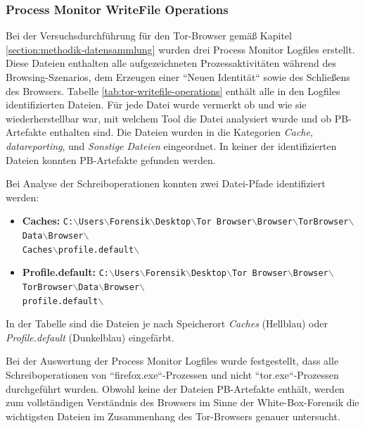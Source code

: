 \begin{appendices}
\subsubsection*{Process Monitor WriteFile Operations}
\label{subsubsection:appendix-tor-common-locations-writefile-operations}
Bei der Versuchsdurchführung für den Tor-Browser gemäß Kapitel \ref{section:methodik-datensammlung} wurden drei Process Monitor Logfiles erstellt.
Diese Dateien enthalten alle aufgezeichneten Prozessaktivitäten während des Browsing-Szenarios, dem Erzeugen einer ``Neuen Identität`` sowie des Schließens des Browsers.
Tabelle \ref{tab:tor-writefile-operations} enthält alle in den Logfiles identifizierten Dateien.
Für jede Datei wurde vermerkt ob und wie sie wiederherstellbar war, mit welchem Tool die Datei analysiert wurde und ob PB-Artefakte enthalten sind.
Die Dateien wurden in die Kategorien \textit{Cache}, \textit{datareporting}, und \textit{Sonstige Dateien} eingeordnet.
In keiner der identifizierten Dateien konnten PB-Artefakte gefunden werden. 

Bei Analyse der Schreiboperationen konnten zwei Datei-Pfade identifiziert werden:
\begin{itemize}
\item \textbf{Caches:} \texttt{C:$\backslash$Users$\backslash$Forensik$\backslash$Desktop$\backslash$Tor Browser$\backslash$Browser$\backslash$TorBrowser$\backslash$Data$\backslash$Browser$\backslash$\\Caches$\backslash$profile.default$\backslash$}
\item \textbf{Profile.default:} \texttt{C:$\backslash$Users$\backslash$Forensik$\backslash$Desktop$\backslash$Tor Browser$\backslash$Browser$\backslash$TorBrowser$\backslash$Data$\backslash$Browser$\backslash$\\profile.default$\backslash$}
\end{itemize}
In der Tabelle sind die Dateien je nach Speicherort \textit{Caches} (Hellblau) oder \textit{Profile.default} (Dunkelblau) eingefärbt. 

Bei der Auswertung der Process Monitor Logfiles wurde festgestellt, dass alle Schreiboperationen von ``firefox.exe``-Prozessen und nicht ``tor.exe``-Prozessen durchgeführt wurden. Obwohl keine der Dateien PB-Artefakte enthält, werden zum vollständigen Verständnis des Browsers im Sinne der White-Box-Forensik die wichtigsten Dateien im Zusammenhang des Tor-Browsers genauer untersucht.


\end{appendices}
